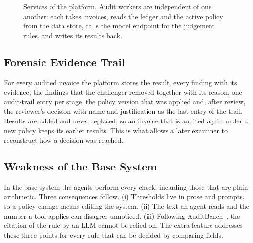 \documentclass[conference]{IEEEtran}
\begin{document}
\begin{figure}[t]
\centering
{}
\caption{Services of the platform. Audit workers are independent of one another: each takes invoices, reads the ledger and the active policy from the data store, calls the model endpoint for the judgement rules, and writes its results back.}
\label{fig:deploy}
\end{figure}

\subsection{Forensic Evidence Trail}
For every audited invoice the platform stores the result, every finding with its evidence, the findings that the challenger removed together with its reason, one audit-trail entry per stage, the policy version that was applied and, after review, the reviewer's decision with name and justification as the last entry of the trail. Results are added and never replaced, so an invoice that is audited again under a new policy keeps its earlier results. This is what allows a later examiner to reconstruct how a decision was reached.

\subsection{Weakness of the Base System}
In the base system the agents perform every check, including those that are plain arithmetic. Three consequences follow. (i) Thresholds live in prose and prompts, so a policy change means editing the system. (ii) The text an agent reads and the number a tool applies can disagree unnoticed. (iii) Following AuditBench~\cite{wang2025auditbench}, the citation of the rule by an LLM cannot be relied on. The extra feature addresses these three points for every rule that can be decided by comparing fields.
\end{document}
